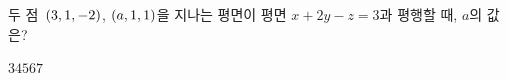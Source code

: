 두 점~$(3{,}\mkern3mu\mathopen{}1{,}\mkern3mu\mathopen{}-2)$, $(a{,}\mkern3mu\mathopen{}1{,}\mkern3mu\mathopen{}1)$을 지나는 평면이 평면 $x+2y-z=3$과 평행할 때, $a$의 값은?
\begin{choices32}{$3$}{$4$}{$5$}{$6$}{$7$}\end{choices32}
